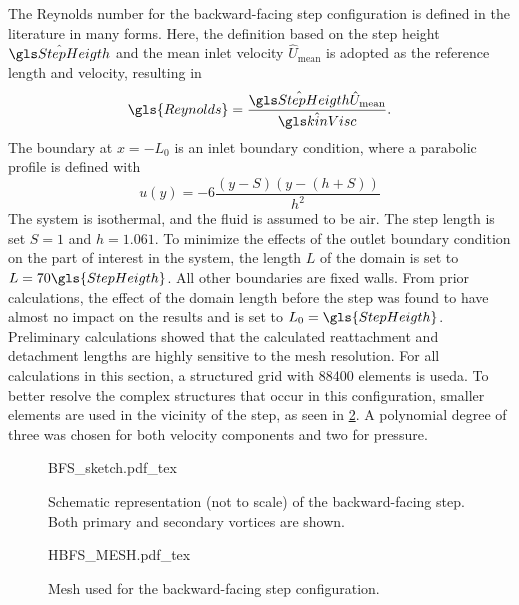 The Reynolds number for the backward-facing step configuration is defined in the literature in many forms. Here, the definition based on the step height $\glsHat{StepHeigth}$ and the mean inlet velocity $\hat U_{\text{mean}}$ is adopted as the reference length and velocity, resulting in
\begin{equation}
	\gls{Reynolds}= \frac{\glsHat{StepHeigth}\hat U_{\text{mean}}}{\glsHat{kinVisc}}.
\end{equation}
The boundary at $x = - L_0$ is an inlet boundary condition, where a parabolic profile is defined with %
\begin{equation}
	u(y) = -6\frac{( y- S)( y-( h+ S))}{h^2} %
\end{equation}
The system is isothermal, and the fluid is assumed to be air. The step length is set $S=1$ and $h = 1.061$. To minimize the effects of the outlet boundary condition on the part of interest in the system, the length $L$ of the domain is set to $L = 70 \gls{StepHeigth}$. All other boundaries are fixed walls. From prior calculations, the effect of the domain length before the step was found to have almost no impact on the results and is set to $L_0 = \gls{StepHeigth}$. Preliminary calculations showed that the calculated reattachment and detachment lengths are highly sensitive to the mesh resolution. For all calculations in this section, a structured grid with 88400 elements is useda. To better resolve the complex structures that occur in this configuration, smaller elements are used in the vicinity of the step, as seen in \cref{bfsmesh}.  A polynomial degree of three was chosen for both velocity components and two for pressure.


\begin{figure}[tb]
	\begin{center}
		\def\svgwidth{0.9\textwidth}
		{BFS_sketch.pdf_tex}
		\caption[Schematic representation of the backward-facing step.]{Schematic representation (not to scale) of the backward-facing step. Both primary and secondary vortices are shown.}
		\label{BFSsketch}
	\end{center}
\end{figure}

\begin{figure}[tb]
	\begin{center}
		\def\svgwidth{0.8\textwidth}
		{HBFS_MESH.pdf_tex}
		\caption{Mesh used for the backward-facing step configuration.}
		\label{bfsmesh}
	\end{center}
\end{figure}

